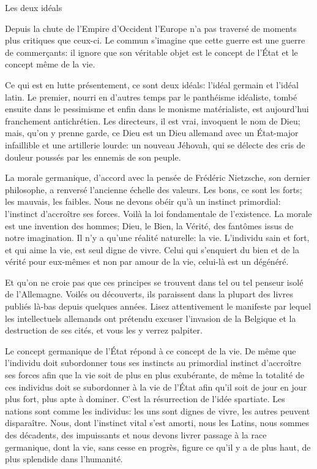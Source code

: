 \begin{chapter}{Les deux idéals}

Depuis la chute de l'Empire d'Occident l'Europe n'a pas traversé de
moments plus critiques que ceux-ci. Le commun s'imagine que cette guerre
est une guerre de commerçants: il ignore que son véritable objet est le
concept de l'État et le concept même de la vie.

Ce qui est en lutte présentement, ce sont deux idéals: l'idéal germain
et l'idéal latin. Le premier, nourri en d'autres temps par le panthéisme
idéaliste, tombé ensuite dans le pessimisme et enfin dans le monisme
matérialiste, est aujourd'hui franchement antichrétien. Les directeurs,
il est vrai, invoquent le nom de Dieu; mais, qu'on y prenne garde, ce
Dieu est un Dieu allemand avec un État-major infaillible et une
artillerie lourde: un nouveau Jéhovah, qui se délecte des cris de
douleur poussés par les ennemis de son peuple.

La morale germanique, d'accord avec la pensée de Frédéric Nietzsche, son
dernier philosophe, a renversé l'ancienne échelle des valeurs. Les bons,
ce sont les forts; les mauvais, les faibles. Nous ne devons obéir qu'à
un instinct primordial: l'instinct d'accroître ses forces. Voilà la loi
fondamentale de l'existence. La morale est une invention des hommes;
Dieu, le Bien, la Vérité, des fantômes issus de notre imagination. Il
n'y a qu'une réalité naturelle: la vie. L'individu sain et fort, et qui
aime la vie, est seul digne de vivre. Celui qui s'enquiert du bien et de
la vérité pour eux-mêmes et non par amour de la vie, celui-là est un
dégénéré.

Et qu'on ne croie pas que ces principes se trouvent dans tel ou tel
penseur isolé de l'Allemagne. Voilés ou découverts, ils paraissent dans
la plupart des livres publiés là-bas depuis quelques années. Lisez
attentivement le manifeste par lequel les intellectuels allemands ont
prétendu excuser l'invasion de la Belgique et la destruction de ses
cités, et vous les y verrez palpiter.

Le concept germanique de l'État répond à ce concept de la vie. De même
que l'individu doit subordonner tous ses instincts au primordial
instinct d'accroître ses forces afin que la vie soit de plus en plus
exubérante, de même la totalité de ces individus doit se subordonner à
la vie de l'État afin qu'il soit de jour en jour plus fort, plus apte à
dominer. C'est la résurrection de l'idée spartiate. Les nations sont
comme les individus: les uns sont dignes de vivre, les autres peuvent
disparaître. Nous, dont l'instinct vital s'est amorti, nous les Latins,
nous sommes des décadents, des impuissants et nous devons livrer passage
à la race germanique, dont la vie, sans cesse en progrès, figure ce
qu'il y a de plus haut, de plus splendide dans l'humanité.


\end{chapter}
